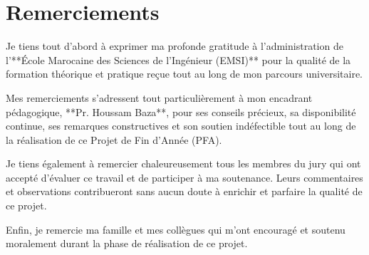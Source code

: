 \chapter*{Remerciements}

Je tiens tout d'abord à exprimer ma profonde gratitude à l'administration de l'**École Marocaine des Sciences de l'Ingénieur (EMSI)** pour la qualité de la formation théorique et pratique reçue tout au long de mon parcours universitaire.

Mes remerciements s'adressent tout particulièrement à mon encadrant pédagogique, **Pr. Houssam Baza**, pour ses conseils précieux, sa disponibilité continue, ses remarques constructives et son soutien indéfectible tout au long de la réalisation de ce Projet de Fin d'Année (PFA).

Je tiens également à remercier chaleureusement tous les membres du jury qui ont accepté d'évaluer ce travail et de participer à ma soutenance. Leurs commentaires et observations contribueront sans aucun doute à enrichir et parfaire la qualité de ce projet.

Enfin, je remercie ma famille et mes collègues qui m'ont encouragé et soutenu moralement durant la phase de réalisation de ce projet.